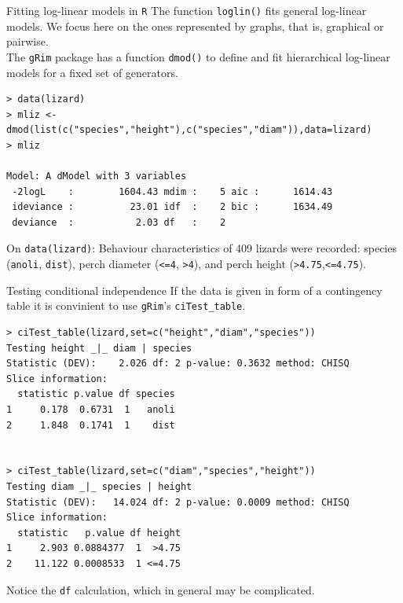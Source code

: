 \documentclass[11pt,handout,aspectratio=169,dvipsnames]{beamer}
\begin{document}
\begin{frame}[fragile]{Fitting log-linear models in \texttt{R}}
The function \texttt{loglin()} fits general log-linear models. We focus here on the ones represented by graphs, that is, graphical or pairwise. \\[.3cm]

The \texttt{gRim} package has a function \texttt{dmod()} to define and fit hierarchical log-linear models for a fixed set of generators. 	
\begin{lstlisting}
> data(lizard)
> mliz <- dmod(list(c("species","height"),c("species","diam")),data=lizard) 	
> mliz

Model: A dModel with 3 variables
 -2logL    :        1604.43 mdim :    5 aic :      1614.43 
 ideviance :          23.01 idf  :    2 bic :      1634.49 
 deviance  :           2.03 df   :    2 
\end{lstlisting}
{\small On \texttt{data(lizard)}: Behaviour characteristics of 409 lizards were recorded: species (\texttt{anoli}, \texttt{dist}), perch diameter (\texttt{<=4}, \texttt{>4}), and perch height (\texttt{>4.75},\texttt{<=4.75}).}
\end{frame}


\begin{frame}[fragile]{Testing conditional independence}
If the data is given in form of a contingency table it is convinient to use \texttt{gRim}'s \texttt{ciTest\_table}.
 
\begin{lstlisting}
> ciTest_table(lizard,set=c("height","diam","species"))
Testing height _|_ diam | species 
Statistic (DEV):    2.026 df: 2 p-value: 0.3632 method: CHISQ
Slice information:
  statistic p.value df species
1     0.178  0.6731  1   anoli
2     1.848  0.1741  1    dist


> ciTest_table(lizard,set=c("diam","species","height"))
Testing diam _|_ species | height 
Statistic (DEV):   14.024 df: 2 p-value: 0.0009 method: CHISQ
Slice information:
  statistic   p.value df height
1     2.903 0.0884377  1  >4.75
2    11.122 0.0008533  1 <=4.75
\end{lstlisting}
Notice the \texttt{df} calculation, which in general may be complicated.

\end{frame}
\end{document}
